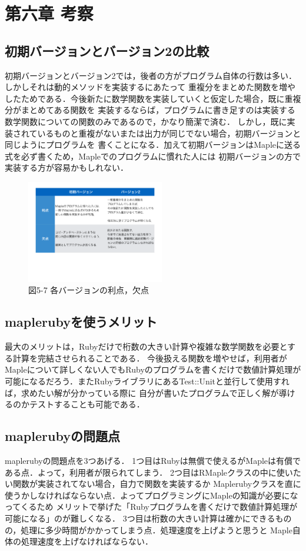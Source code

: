 \section{第六章 考察}
\subsection{初期バージョンとバージョン2の比較}
初期バージョンとバージョン2では，後者の方がプログラム自体の行数は多い．しかしそれは動的メソッドを実装するにあたって
重複分をまとめた関数を増やしたためである．今後新たに数学関数を実装していくと仮定した場合，既に重複分がまとめてある関数を
実装するならば，プログラムに書き足すのは実装する数学関数についての関数のみであるので，かなり簡潔で済む．
しかし，既に実装されているものと重複がないまたは出力が同じでない場合，初期バージョンと同じようにプログラムを
書くことになる．加えて初期バージョンはMapleに送る式を必ず書くため，Mapleでのプログラムに慣れた人には
初期バージョンの方で実装する方が容易かもしれない．

\begin{figure}[htbp]\begin{center}
\includegraphics[width=6cm,bb=0 0 442 500]{../figs/./mapleruby_eringi.009.png}
\caption{図5-7 各バージョンの利点，欠点}
\label{default}\end{center}\end{figure}
\subsection{maplerubyを使うメリット}
最大のメリットは，Rubyだけで桁数の大きい計算や複雑な数学関数を必要とする計算を完結させられることである．
今後扱える関数を増やせば，利用者がMapleについて詳しくない人でもRubyのプログラムを書くだけで数値計算処理が
可能になるだろう．またRubyライブラリにあるTest::Unitと並行して使用すれば，求めたい解が分かっている際に
自分が書いたプログラムで正しく解が導けるのかテストすることも可能である．

\subsection{maplerubyの問題点}
maplerubyの問題点を3つあげる．
1つ目はRubyは無償で使えるがMapleは有償である点．よって，利用者が限られてしまう．
2つ目はRMapleクラスの中に使いたい関数が実装されてない場合，自力で関数を実装するか
Maplerubyクラスを直に使うかしなければならない点．よってプログラミングにMapleの知識が必要になってくるため
メリットで挙げた「Rubyプログラムを書くだけで数値計算処理が可能になる」のが難しくなる．
3つ目は桁数の大きい計算は確かにできるものの，処理に多少時間がかかってしまう点．処理速度を上げようと思うと
Maple自体の処理速度を上げなければならない．

